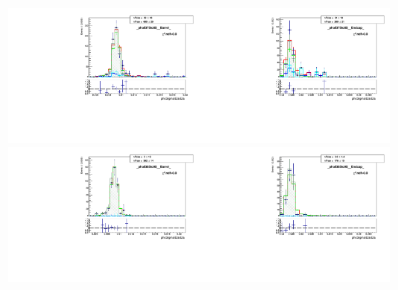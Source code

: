 \begin{figure}[htb]
  \begin{center}
   \includegraphics[width=0.45\textwidth]{../figs/figs_v11/MUON_WGamma/MCclosureWjetsPlusWg/c_TEMPL_SIHIH_UNblind__phoEt75to85__Barrel__RooFit_MCclosure.pdf}\includegraphics[width=0.45\textwidth]{../figs/figs_v11/MUON_WGamma/MCclosureWjetsPlusWg/c_TEMPL_SIHIH_UNblind__phoEt75to85__Endcap__RooFit_MCclosure.pdf}\\
   \includegraphics[width=0.45\textwidth]{../figs/figs_v11/MUON_WGamma/MCclosureWjetsPlusWg/c_TEMPL_SIHIH_UNblind__phoEt85to95__Barrel__RooFit_MCclosure.pdf}\includegraphics[width=0.45\textwidth]{../figs/figs_v11/MUON_WGamma/MCclosureWjetsPlusWg/c_TEMPL_SIHIH_UNblind__phoEt85to95__Endcap__RooFit_MCclosure.pdf}\\

\end{center}
\end{figure}
